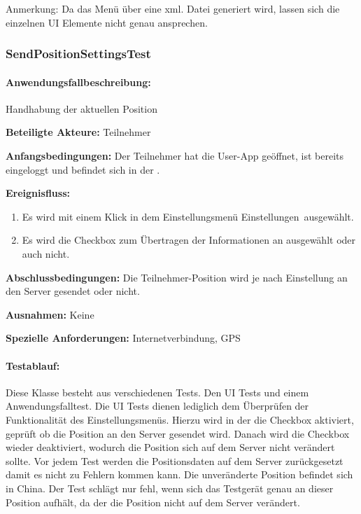 Anmerkung: Da das Menü über eine xml. Datei generiert wird, lassen sich die einzelnen UI Elemente nicht genau ansprechen.



\subsubsection{SendPositionSettingsTest}
\paragraph{Anwendungsfallbeschreibung:} Handhabung der aktuellen Position

\textbf{Beteiligte Akteure:}
	Teilnehmer
	
\textbf{Anfangsbedingungen:}
	Der Teilnehmer hat die User-App geöffnet, ist bereits eingeloggt und befindet sich in der .
	
\textbf{Ereignisfluss:}
	\begin{enumerate}
		\item Es wird mit einem Klick in dem Einstellungsmenü \glqq Einstellungen\grqq\ ausgewählt.
		\item Es wird die Checkbox zum Übertragen der Informationen an ausgewählt oder auch nicht.
	\end{enumerate}
	
\textbf{Abschlussbedingungen:}
	Die Teilnehmer-Position wird je nach Einstellung an den Server gesendet oder nicht.
	
\textbf{Ausnahmen:}
	Keine
	
\textbf{Spezielle Anforderungen:}
	Internetverbindung, GPS

\paragraph{Testablauf:}
Diese Klasse besteht aus verschiedenen Tests. Den UI Tests und einem Anwendungsfalltest. Die UI Tests dienen lediglich dem Überprüfen der Funktionalität des Einstellungsmenüs. Hierzu wird in der  die Checkbox aktiviert, geprüft ob die Position an den Server gesendet wird. Danach wird die Checkbox wieder deaktiviert, wodurch die Position sich auf dem Server nicht verändert sollte. Vor jedem Test werden die Positionsdaten auf dem Server zurückgesetzt damit es nicht zu Fehlern kommen kann. Die unveränderte Position befindet sich in China. Der Test schlägt nur fehl, wenn sich das Testgerät genau an dieser Position aufhält, da der  die Position nicht auf dem Server verändert.

